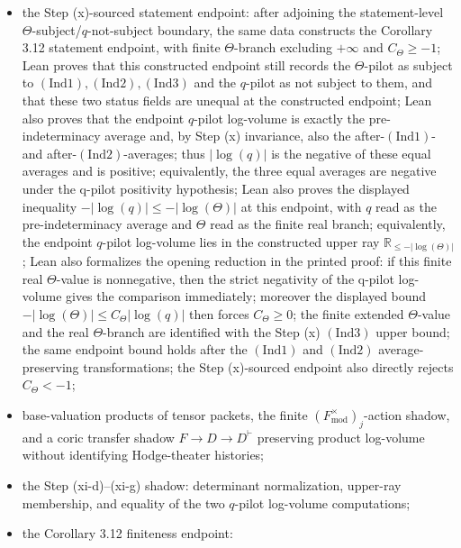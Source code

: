 \documentclass[11pt]{article}
\begin{document}
\begin{itemize}
  adding \(|\log(q)|>0\) for the pre-indeterminacy q-pilot average and the
  displayed upper bound
  \(-|\log(\Theta)|\le C_\Theta|\log(q)|\) yields \(C_\Theta\ge-1\);
\item the Step (x)-sourced statement endpoint:
  after adjoining the statement-level
  \(\Theta\)-subject/\(q\)-not-subject boundary, the same data constructs the
  Corollary 3.12 statement endpoint, with finite \(\Theta\)-branch excluding
  \(+\infty\) and \(C_\Theta\ge-1\); Lean proves that this constructed endpoint still records
  the \(\Theta\)-pilot as subject to \((\mathrm{Ind1}),(\mathrm{Ind2}),
  (\mathrm{Ind3})\) and the \(q\)-pilot as not subject to them, and that these
  two status fields are unequal at the constructed endpoint; Lean also proves
  that the endpoint \(q\)-pilot log-volume is exactly the pre-indeterminacy
  average and, by Step (x) invariance, also the after-\((\mathrm{Ind1})\)- and
  after-\((\mathrm{Ind2})\)-averages; thus \(|\log(q)|\) is the negative of
  these equal averages and is positive; equivalently, the three equal averages
  are negative under the q-pilot positivity hypothesis; Lean also proves
  the displayed inequality
  \(-|\log(q)|\le-|\log(\Theta)|\) at this endpoint, with \(q\) read as the
  pre-indeterminacy average and \(\Theta\) read as the finite real branch;
  equivalently, the endpoint \(q\)-pilot log-volume lies in the constructed
  upper ray \(\mathbb{R}_{\le-|\log(\Theta)|}\);
  Lean also formalizes the opening reduction in the printed proof: if this
  finite real \(\Theta\)-value is nonnegative, then the strict negativity of the
  q-pilot log-volume gives the comparison immediately; moreover the displayed
  bound
  \(-|\log(\Theta)|\le C_\Theta|\log(q)|\) then forces \(C_\Theta\ge0\);
  the finite extended \(\Theta\)-value and the real \(\Theta\)-branch are
  identified with the Step (x) \((\mathrm{Ind3})\) upper bound; the same endpoint bound holds after the
  \((\mathrm{Ind1})\) and \((\mathrm{Ind2})\) average-preserving
  transformations; the Step (x)-sourced endpoint also directly rejects
  \(C_\Theta<-1\);
\item base-valuation products of tensor packets, the finite
  \((F_{\mathrm{mod}}^\times)_j\)-action shadow, and a coric transfer shadow
  \(F\to D\to D^\vdash\) preserving product log-volume without identifying
  Hodge-theater histories;
\item the Step (xi-d)--(xi-g) shadow: determinant normalization, upper-ray
  membership, and equality of the two \(q\)-pilot log-volume computations;
\item the Corollary 3.12 finiteness endpoint:

\end{itemize}
\end{document}
